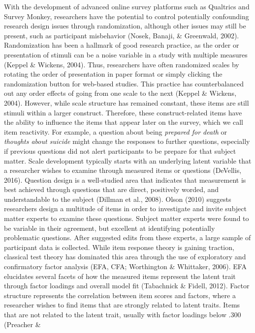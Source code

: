\documentclass[english,man, mask]{apa6}
\theoremstyle{definition}
\theoremstyle{definition}
\theoremstyle{definition}
\theoremstyle{remark}
\begin{document}
With the development of advanced online survey platforms such as
Qualtrics and Survey Monkey, researchers have the potential to control
potentially confounding research design issues through randomization,
although other issues may still be present, such as participant
misbehavior (Nosek, Banaji, \& Greenwald, 2002). Randomization has been
a hallmark of good research practice, as the order or presentation of
stimuli can be a noise variable in a study with multiple measures
(Keppel \& Wickens, 2004). Thus, researchers have often randomized
scales by rotating the order of presentation in paper format or simply
clicking the randomization button for web-based studies. This practice
has counterbalanced out any order effects of going from one scale to the
next (Keppel \& Wickens, 2004). However, while scale structure has
remained constant, these items are still stimuli within a larger
construct. Therefore, these construct-related items have the ability to
influence the items that appear later on the survey, which we call item
reactivity. For example, a question about being \emph{prepared for
death} or \emph{thoughts about suicide} might change the responses to
further questions, especially if previous questions did not alert
participants to be prepare for that subject matter. Scale development
typically starts with an underlying latent variable that a researcher
wishes to examine through measured items or questions (DeVellis, 2016).
Question design is a well-studied area that indicates that measurement
is best achieved through questions that are direct, positively worded,
and understandable to the subject (Dillman et al., 2008). Olson (2010)
suggests researchers design a multitude of items in order to investigate
and invite subject matter experts to examine these questions. Subject
matter experts were found to be variable in their agreement, but
excellent at identifying potentially problematic questions. After
suggested edits from these experts, a large sample of participant data
is collected. While item response theory is gaining traction, classical
test theory has dominated this area through the use of exploratory and
confirmatory factor analysis (EFA, CFA; Worthington \& Whittaker, 2006).
EFA elucidates several facets of how the measured items represent the
latent trait through factor loadings and overall model fit (Tabachnick
\& Fidell, 2012). Factor structure represents the correlation between
item scores and factors, where a researcher wishes to find items that
are strongly related to latent traits. Items that are not related to the
latent trait, usually with factor loadings below .300 (Preacher \&
\end{document}
